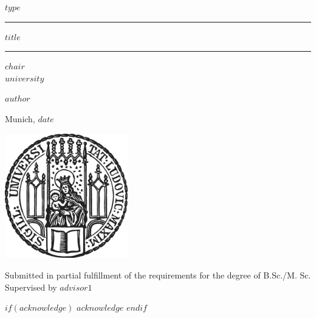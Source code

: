 \documentclass[12pt]{article}
\newcommand{\mytitle}{$title$}
\begin{document}

\begin{titlepage}
\begin{center}

\LARGE
$type$

\vspace{0.5cm}

\rule{\textwidth}{1.5pt}
\LARGE
\textbf{\mytitle}
\rule{\textwidth}{1.5pt}

\vspace{0.5cm}

\large
$chair$ \\
$university$

\vfill

\Large
\textbf{$author$}

\vfill

\large
Munich, $date$

\vfill

\includegraphics[width = 0.4\textwidth]{figures/sigillum.png}

\vfill

\normalsize
Submitted in partial fulfillment of the requirements for the degree of B.Sc./M. Sc.
\\

Supervised by $advisor1$

\end{center}
\end{titlepage}


\newpage

$if(acknowledge)$
\newpage
$acknowledge$
$endif$
\pagestyle{plain}
\setcounter{page}{1}    %
\end{document}

